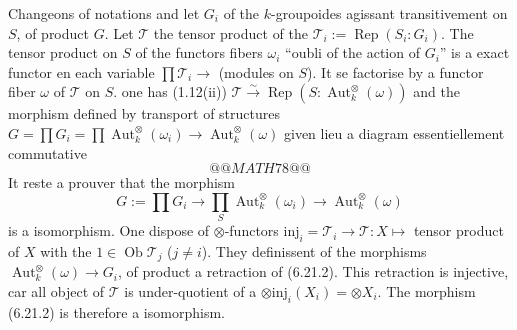 \documentclass[12pt,a4paper]{article}
\theoremstyle{plain}
\theoremstyle{definition}
\theoremstyle{remark}
\DeclareMathOperator{\Aut}{Aut}
\DeclareMathOperator{\Rep}{Rep}
\DeclareMathOperator{\Ob}{Ob}
\begin{document}
Changeons of notations and let $G_i$ of the $k$-groupoides agissant transitivement on $S$, of product $G$. Let $\mathcal{T}$ the tensor product of the $\mathcal{T}_i := \Rep(S_i:G_i)$. The tensor product on $S$ of the functors fibers $\omega_i$ ``oubli of the action of $G_i$'' is a exact functor en each variable $\prod \mathcal{T}_i \to$ (modules on $S$). It se factorise by a functor fiber $\omega$ of $\mathcal{T}$ on $S$. one has (1.12(ii)) $\mathcal{T} \xrightarrow{\sim} \Rep(S:\Aut^\otimes_k(\omega))$ and the morphism defined by transport of structures $G = \prod G_i = \prod \Aut^\otimes_k(\omega_i) \to \Aut^\otimes_k(\omega)$ given lieu a diagram essentiellement commutative
\[
@@MATH78@@
\]
It reste a prouver that the morphism
\begin{equation}\label{eq:6.21.2}
G := \prod G_i \to \prod_S \Aut^\otimes_k(\omega_i) \to \Aut^\otimes_k(\omega)
\end{equation}
is a isomorphism. One dispose of $\otimes$-functors $\mathrm{inj}_i = \mathcal{T}_i \to \mathcal{T} : X \mapsto$ tensor product of $X$ with the $1 \in \Ob\mathcal{T}_j$ ($j \neq i$). They definissent of the morphisms $\Aut^\otimes_k(\omega) \to G_i$, of product a retraction of (6.21.2). This retraction is injective, car all object of $\mathcal{T}$ is under-quotient of a $\otimes \mathrm{inj}_i(X_i) = \otimes X_i$. The morphism (6.21.2) is therefore a isomorphism.
\end{document}
